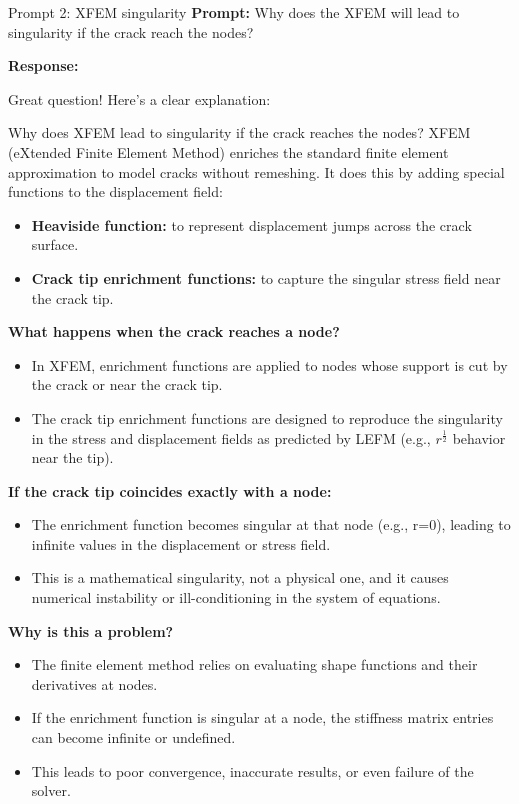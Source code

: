 \documentclass[12pt]{article}
\begin{document}
\newpage
\begin{summarybox}{Prompt 2: XFEM singularity}
\textbf{Prompt:} Why does the XFEM will lead to singularity if the crack reach the nodes?
\vspace{1em}

\textbf{Response:}

Great question! Here’s a clear explanation:

Why does XFEM lead to singularity if the crack reaches the nodes?
XFEM (eXtended Finite Element Method) enriches the standard finite element approximation to model cracks without remeshing. It does this by adding special functions to the displacement field:

\begin{itemize}
    \item \textbf{Heaviside function:} to represent displacement jumps across the crack surface.
    \item \textbf{Crack tip enrichment functions:} to capture the singular stress field near the crack tip.
\end{itemize}

\textbf{What happens when the crack reaches a node?}

\begin{itemize}
    \item In XFEM, enrichment functions are applied to nodes whose support is cut by the crack or near the crack tip.
    \item The crack tip enrichment functions are designed to reproduce the singularity in the stress and displacement fields as predicted by LEFM (e.g., $r^{\frac{1}{2}}$
  behavior near the tip).
\end{itemize}

\textbf{If the crack tip coincides exactly with a node:}
\begin{itemize}
    \item The enrichment function becomes singular at that node (e.g., r=0), leading to infinite values in the displacement or stress field.
    \item This is a mathematical singularity, not a physical one, and it causes numerical instability or ill-conditioning in the system of equations.
\end{itemize}

\textbf{Why is this a problem?}
\begin{itemize}
    \item The finite element method relies on evaluating shape functions and their derivatives at nodes.
    \item If the enrichment function is singular at a node, the stiffness matrix entries can become infinite or undefined.
    \item This leads to poor convergence, inaccurate results, or even failure of the solver.
\end{itemize}

\end{summarybox}
\end{document}
